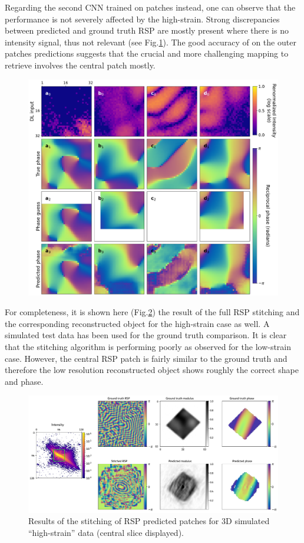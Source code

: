 Regarding the second CNN trained on patches instead, one can observe that the performance is not severely affected by the 
high-strain. Strong discrepancies between predicted and ground truth RSP are mostly present where there is no intensity signal, 
thus not relevant (see Fig.\ref{fig:outer_highstrain}). The good accuracy of on the outer patches predictions suggests that the crucial and more challenging 
mapping to retrieve involves the central patch mostly. 
\begin{figure}[H]
    \centering
    \includegraphics[width=\textwidth]{figures/Phasing/outer_patches_high_strain_RSP.pdf}
    \caption{}
    \label{fig:outer_highstrain}
\end{figure}
For completeness, it is shown here (Fig.\ref{fig:stitching_highstrain}) the result of the full RSP stitching and the corresponding reconstructed object for 
the high-strain case as well. A simulated test data has been used for the ground truth comparison. It is clear that the 
stitching algorithm is performing poorly as observed for the low-strain case. However, the central RSP patch is fairly 
similar to the ground truth and therefore the low resolution reconstructed object shows roughly the correct shape and 
phase. 

\begin{figure}[H]
    \centering
    \includegraphics[width=\textwidth]{figures/Phasing/stitching_high_strain_sim.pdf}
    \caption{Results of the stitching of RSP predicted patches for 3D simulated ``high-strain'' data (central slice displayed).}
    \label{fig:stitching_highstrain}
\end{figure}

